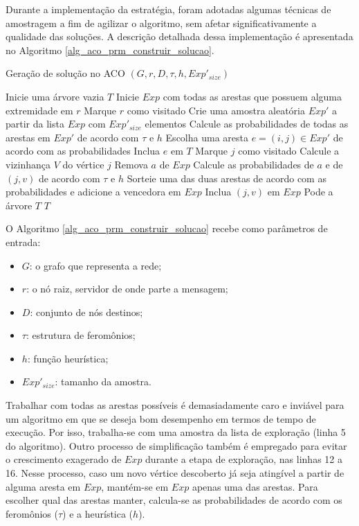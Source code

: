 Durante a implementação da estratégia, foram adotadas algumas técnicas de amostragem a fim de agilizar o algoritmo, sem afetar significativamente a qualidade das soluções. A descrição detalhada dessa implementação é apresentada no Algoritmo \ref{alg_aco_prm_construir_solucao}.

\begin{algorithm}
	\caption{Geração de solução no ACO $(G, r, D, \tau, h, Exp'_{size})$}
	\label{alg_aco_prm_construir_solucao}
	\begin{algorithmic}[1]
		\State Inicie uma árvore vazia $T$
		\State Inicie $Exp$ com todas as arestas que possuem alguma extremidade em $r$
		\State Marque $r$ como visitado
			\State Crie uma amostra aleatória $Exp'$ a partir da lista $Exp$ com $Exp'_{size}$ elementos
			\State Calcule as probabilidades de todas as arestas em $Exp'$ de acordo com $\tau$ e $h$
			\State Escolha uma aresta $e=(i,j) \in Exp'$ de acordo com as probabilidades
			\State Inclua $e$ em $T$
			\State Marque $j$ como visitado
			\State Calcule a vizinhança $V$ do vértice $j$
					\State Remova $a$ de $Exp$
					\State Calcule as probabilidades de $a$ e de $(j, v)$ de acordo com $\tau$ e $h$
					\State Sorteie uma das duas arestas de acordo com as probabilidades e adicione a vencedora em $Exp$
					\State Inclua $(j, v)$ em $Exp$
				\EndIf
			\EndFor
		\EndWhile
		\State Pode a árvore $T$
		\State \Return $T$
	\end{algorithmic}
\end{algorithm}

O Algoritmo \ref{alg_aco_prm_construir_solucao} recebe como parâmetros de entrada:

\begin{itemize}
	\item $G$: o grafo que representa a rede;
	\item $r$: o nó raiz, servidor de onde parte a mensagem;
	\item $D$: conjunto de nós destinos;
	\item $\tau$: estrutura de feromônios;
	\item $h$: função heurística;
	\item $Exp'_{size}$: tamanho da amostra.
\end{itemize}

Trabalhar com todas as arestas possíveis é demasiadamente caro e inviável para um algoritmo em que se deseja bom desempenho em termos de tempo de execução. Por isso, trabalha-se com uma amostra da lista de exploração (linha 5 do algoritmo). Outro processo de simplificação também é empregado para evitar o crescimento exagerado de $Exp$ durante a etapa de exploração, nas linhas 12 a 16. Nesse processo, caso um novo vértice descoberto já seja atingível a partir de alguma aresta em $Exp$, mantém-se em $Exp$ apenas uma das arestas. Para escolher qual das arestas manter, calcula-se as probabilidades de acordo com os feromônios ($\tau$) e a heurística ($h$).

